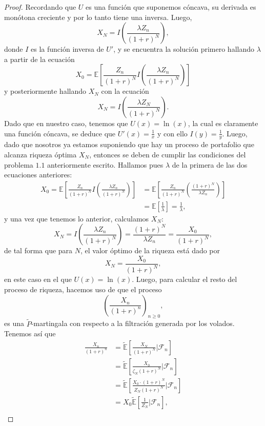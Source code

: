 \documentclass[letterpaper]{article}
\newcommand{\F}{\mathcal{F}}
\newcommand{\E}{\mathbb{E}}
\newcommand{\1}{\mathds{1}}
\theoremstyle{definition}
\theoremstyle{definition}
\theoremstyle{definition}
\theoremstyle{definition}
\theoremstyle{definition}
\begin{document}
\begin{enumerate}
\begin{proof}
       Recordando que $U$ es una función que suponemos cóncava, su derivada es monótona creciente y
       por lo tanto tiene una inversa. Luego, 
       \[
       X_N=I \left(\frac{\lambda Z_n}{(1+r)^N}\right),
       \]
       donde $I$ es la función inversa de $U'$, y se encuentra la solución primero hallando
       $\lambda$ a partir de la ecuación 
       \[
       X_0=\E\left[\frac{Z_n}{(1+r)^N}I \left(\frac{\lambda Z_n}{(1+r)^N}\right)\right] 
       \]
       y posteriormente hallando $X_N$ con la ecuación 
       \[
        X_N=I \left(\frac{\lambda Z_N}{(1+r)^N}\right).
       \]
       Dado que en nuestro caso, tenemos que $U(x)=\ln(x)$, la cual es claramente
       una función cóncava, se deduce que $U'(x)=\frac{1}{x}$ y con ello $I(y)=\frac{1}{y}$.
       Luego, dado que nosotros ya estamos suponiendo que hay un proceso de portafolio que 
       alcanza riqueza óptima $X_N$, entonces se deben de cumplir las condiciones del problema $1.1$ 
       anteriormente escrito. Hallamos pues $\lambda$ de la primera de las dos ecuaciones anteriores:
        \begin{align*}
            X_0=\E\left[\frac{Z_n}{(1+r)^N}I \left(\frac{\lambda Z_n}{(1+r)^N}\right)\right]&=\E\left[\frac{Z_n}{(1+r)^N} \left(\frac{(1+r)^N}{\lambda Z_n}\right)\right]\\
            &=\E\left[\frac{1}{\lambda}\right]=\frac{1}{\lambda},
        \end{align*}
        y una vez que tenemos lo anterior, calculamos $X_N$:
        \[
        X_N= I \left(\frac{\lambda Z_n}{(1+r)^N}\right)=\frac{(1+r)^{N}}{\lambda Z_n}=\frac{X_0}{(1+r)^N},
        \]
        de tal forma que para $N$, el valor óptimo de la riqueza está dado por 
        \[
        X_N=\frac{X_0}{(1+r)^{N}},    
        \]
        en este caso en el que $U(x)=\ln(x)$. Luego, para calcular el resto del proceso de riqueza, hacemos
        uso de que el proceso 
        \[
        \left(\frac{X_n}{(1+r)^n}\right)_{n\geq0},    
        \]
        es una $\tilde{P}$-martingala con respecto a la filtración generada por los volados. Tenemos 
        así que 
        \begin{align*}
            \frac{X_n}{(1+r)^n}&=\tilde{\E}\left[\frac{X_N}{(1+r)^N}\big|\F_n\right]\\
            &=\tilde{\E}\left[\frac{X_0}{\zeta_N(1+r)^N}\big|\F_n\right]\\
            &=\tilde{\E}\left[\frac{X_0\cdot (1+r)^N}{Z_N(1+r)^N}\big|\F_n\right]\\
            &=X_0\tilde{\E}\left[\frac{1}{Z_N}\big|\F_n\right],\\

\end{align*}
\end{proof}
\end{enumerate}
\end{document}
